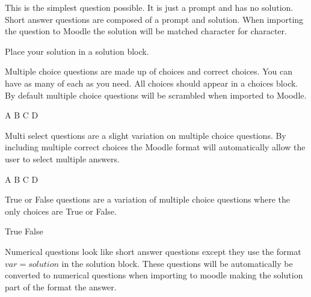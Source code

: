 \documentclass[12pt]{exam}
\begin{document}
        \begin{questions}
                This is the simplest question possible. It is just a prompt and has no solution.
                Short answer questions are composed of a prompt and solution. When importing the question to Moodle the
                solution will be matched character for character.
                \begin{solution}
                    Place your solution in a solution block.
                \end{solution}
                Multiple choice questions are made up of choices and correct choices. You can have as many of each as
                you need. All choices should appear in a choices block. By default multiple choice questions will be
                scrambled when imported to Moodle.
                \begin{choices}
                    \choice A
                    \choice B
                    \choice C
                    \CorrectChoice D
                \end{choices}
                Multi select questions are a slight variation on multiple choice questions. By including multiple
                correct choices the Moodle format will automatically allow the user to select multiple answers.
                \begin{choices}
                    \choice A
                    \CorrectChoice B
                    \choice C
                    \CorrectChoice D
                \end{choices}
                True or False questions are a variation of multiple choice questions where the only choices are True or
                False.
                \begin{choices}
                    \choice True
                    \CorrectChoice False
                \end{choices}
                Numerical questions look like short answer questions except they use the format $var=solution$ in the
                solution block. These questions will be automatically be converted to numerical questions when
                importing to moodle making the solution part of the format the answer.
                \begin{solution}

\end{solution}
\end{questions}
\end{document}
